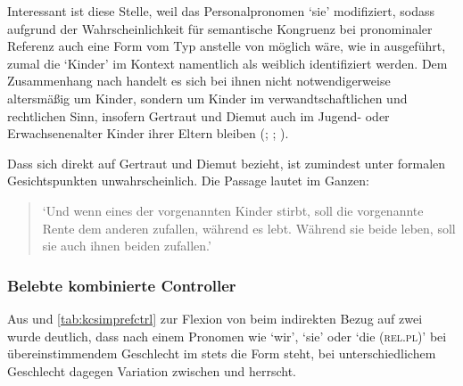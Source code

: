 Interessant ist diese Stelle, weil  das Personalpronomen 
`sie' modifiziert, sodass aufgrund der Wahrscheinlichkeit für semantische
Kongruenz bei pronominaler Referenz auch eine Form vom Typ 
anstelle von  möglich wäre, wie in 
ausgeführt, zumal die  `Kinder' im Kontext namentlich als weiblich
identifiziert werden. Dem Zusammenhang nach handelt es sich bei ihnen nicht
notwendigerweise altersmäßig um Kinder, sondern um Kinder im
verwandt\-schaft\-lichen und rechtlichen Sinn, insofern Gertraut und Diemut
auch im Jugend- oder Erwachsenen\-alter Kinder ihrer Eltern bleiben
(\cites(Nr.~2960)[240,31+35]{cao4};
\cites(Nr.~2719)[vgl.~auch][96,40--97,18]{cao4}; \cite[569, 619]{caor}).

Dass sich  direkt auf Gertraut und Diemut bezieht, ist
zumindest unter formalen Gesichtspunkten unwahrscheinlich. Die Passage lautet
im Ganzen:

\begin{quote}
	 \autocites(Nr.~2960)[240,37--39]{cao4}

`Und wenn eines der vorgenannten Kinder
stirbt, soll die vorgenannte Rente dem anderen zufallen, während es lebt.
Während sie beide leben, soll sie auch ihnen beiden zufallen.'
\end{quote}

\subsubsection{Belebte kombinierte Controller}

Aus  und \ref{tab:kcsimprefctrl} zur Flexion von
 beim indirekten Bezug auf zwei  wurde
deutlich, dass nach einem Pronomen wie  `wir',  `sie' oder
 `die (\textsc{rel.pl})' bei übereinstimmendem Geschlecht im \CAO{}
stets die Form  steht, bei unterschiedlichem Geschlecht dagegen
Variation zwischen   und 
 herrscht.

